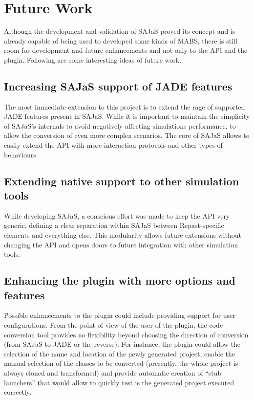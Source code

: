 \section{Future Work}
\label{sec:futurework}

Although the development and validation of SAJaS proved its concept and is already capable of being used to developed some kinds of MABS, there is still room for development and future enhancements and not only to the API and the plugin. Following are some interesting ideas of future work.

\subsection{Increasing SAJaS support of JADE features}
The most immediate extension to this project is to extend the rage of supported JADE features present in SAJaS. While it is important to maintain the simplicity of SAJaS's internals to avoid negatively affecting simulations performance, to allow the conversion of even more complex scenarios. The core of SAJaS allows to easily extend the API with more interaction protocols and other types of behaviours.

\subsection{Extending native support to other simulation tools}
While developing SAJaS, a conscious effort was made to keep the API very generic, defining a clear separation within SAJaS between Repast-specific elements and everything else. This modularity allows future extensions without changing the API and opens doors to future integration with other simulation tools.

\subsection{Enhancing the plugin with more options and features}
Possible enhancements to the plugin could include providing support for user configurations. From the point of view of the user of the plugin, the code conversion tool provides no flexibility beyond choosing the direction of conversion (from SAJaS to JADE or the reverse). For instance, the plugin could allow the selection of the name and location of the newly generated project, enable the manual selection of the classes to be converted (presently, the whole project is always cloned and transformed) and provide automatic creation of ``stub launchers'' that would allow to quickly test is the generated project executed correctly.

